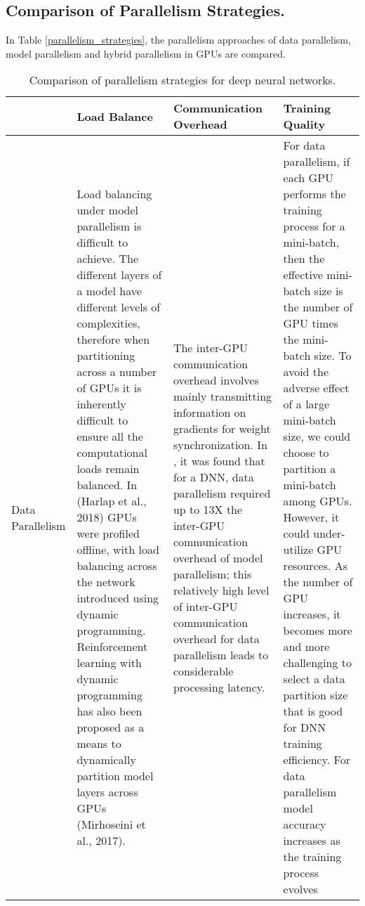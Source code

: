 \documentclass[10pt]{article}[draft]
\newlength\mylen
\begin{document}
\subsection{Comparison of Parallelism Strategies.}

In Table \ref{parallelism_strategies}, the parallelism approaches of data parallelism, model parallelism and hybrid parallelism in GPUs are compared. 

\begin{table}[htbpp]
	\small
	\setlength\tabcolsep{3pt} %
	\captionsetup{font=small,skip=0.333\baselineskip}
	\caption{Comparison of parallelism strategies for deep neural networks.} \label{T2.6}

	\begin{center}
	\begin{tabularx}{\textwidth}{@{} p{\mylen} LLL @{}}
		\toprule
		& 
		Load Balance  & 
		Communication Overhead& 
		Training Quality \\ 
		\midrule
		Data Parallelism & 
		Load balancing under model parallelism is difficult to achieve. The different layers of a model have different levels of complexities, therefore  when partitioning across a number of GPUs it is inherently difficult to ensure all the computational loads remain balanced. In (Harlap et al., 2018)  GPUs were profiled offline, with load balancing  across the network   introduced  using dynamic programming.  Reinforcement learning with dynamic programming has  also been proposed as a means to  dynamically partition  model layers across GPUs (Mirhoseini et al., 2017). & 
		The inter-GPU communication overhead involves mainly transmitting information on  gradients for weight synchronization. In \cite{https://arxiv.org/pdf/1809.02839.pdf}, it was found that for a DNN, data parallelism required up to 13X the inter-GPU communication overhead of model parallelism; this relatively high level of inter-GPU communication overhead for data parallelism
		leads to considerable processing latency.  & 
	 	For data parallelism, if each GPU performs the training process for a mini-batch, then the effective mini-batch size is the number of GPU times the mini-batch size. To avoid the adverse effect of a large mini-batch size, we
	 	could choose to partition a mini-batch among GPUs. However, it could under-utilize GPU resources. As the number of GPU increases, it becomes more and more challenging to select a data partition size that is good for DNN training efficiency. For data parallelism model accuracy increases as the training process evolves\\ 

\end{tabularx}
\end{center}
\end{table}
\end{document}
